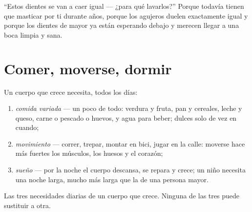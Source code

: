 \begin{remark}\label{rem:g1:healthy-habits:babyteeth}
``Estos dientes se van a caer igual --- ¿para qué lavarlos?'' Porque
todavía tienen que masticar por ti durante años, porque los agujeros
duelen exactamente igual y porque los dientes de mayor ya están
esperando debajo y merecen llegar a una boca limpia y sana.
\end{remark}

\section{Comer, moverse, dormir}

\begin{proposition}\label{prop:g1:healthy-habits:needs}
Un cuerpo que crece necesita, todos los días:
\begin{enumerate}
  \item \emph{comida variada} --- un poco de
        todo: verdura y fruta, pan y cereales, leche y queso, carne o
        pescado o huevos, y agua para beber; dulces solo de vez en
        cuando;
  \item \emph{movimiento} --- correr, trepar, montar
        en bici, jugar en la calle: moverse hace más fuertes los
        músculos, los huesos y el corazón;
  \item \emph{sueño} --- por la noche el cuerpo descansa,
        se repara y crece; un niño necesita una noche larga, mucho más
        larga que la de una persona mayor.
\end{enumerate}
\end{proposition}
\admitted

\begin{omfigure}

{\small Las tres necesidades diarias de un cuerpo que crece. Ninguna
de las tres puede sustituir a otra.}
\end{omfigure}

